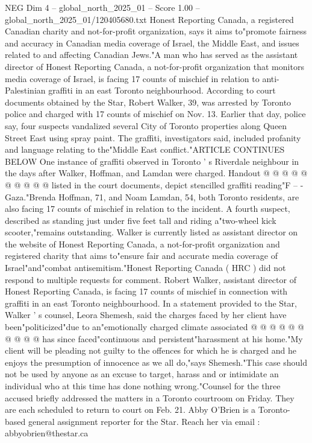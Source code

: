 \begin{textsample}{NEG Dim 4 – global\_north\_2025\_01 – Score 1.00 – global\_north\_2025\_01/120405680.txt}  \label{ex:f4_neg_416}
Honest Reporting Canada, a registered Canadian charity and not-for-profit organization, says it aims to"promote fairness and accuracy in Canadian media coverage of Israel, the Middle East, and issues related to and affecting Canadian Jews."A man who has served as the assistant director of Honest Reporting Canada, a not-for-profit organization that monitors media coverage of Israel, is facing 17 counts of mischief in relation to anti-Palestinian graffiti in an east Toronto neighbourhood.
According to court documents obtained by the Star, Robert Walker, 39, was arrested by Toronto police and charged with 17 counts of mischief on Nov. 13.
Earlier that day, police say, four suspects vandalized several City of Toronto properties along Queen Street East using spray paint.
The graffiti, investigators said, included profanity and language relating to the"Middle East conflict."ARTICLE CONTINUES BELOW One instance of graffiti observed in Toronto ' s Riverdale neighbour in the days after Walker, Hoffman, and Lamdan were charged.
Handout @ @ @ @ @ @ @ @ @ @ listed in the court documents, depict stencilled graffiti reading"F -- - Gaza."Brenda Hoffman, 71, and Noam Lamdan, 54, both Toronto residents, are also facing 17 counts of mischief in relation to the incident.
A fourth suspect, described as standing just under five feet tall and riding a"two-wheel kick scooter,"remains outstanding.
Walker is currently listed as assistant director on the website of Honest Reporting Canada, a not-for-profit organization and registered charity that aims to"ensure fair and accurate media coverage of Israel"and"combat antisemitism."Honest Reporting Canada ( HRC ) did not respond to multiple requests for comment.
Robert Walker, assistant director of Honest Reporting Canada, is facing 17 counts of mischief in connection with graffiti in an east Toronto neighbourhood.
In a statement provided to the Star, Walker ' s counsel, Leora Shemesh, said the charges faced by her client have been"politicized"due to an"emotionally charged climate associated @ @ @ @ @ @ @ @ @ @ has since faced"continuous and persistent"harassment at his home."My client will be pleading not guilty to the offences for which he is charged and he enjoys the presumption of innocence as we all do,"says Shemesh."This case should not be used by anyone as an excuse to target, harass and or intimidate an individual who at this time has done nothing wrong."Counsel for the three accused briefly addressed the matters in a Toronto courtroom on Friday.
They are each scheduled to return to court on Feb. 21.
Abby O'Brien is a Toronto-based general assignment reporter for the Star.
Reach her via email : abbyobrien@thestar.ca

\end{textsample}
